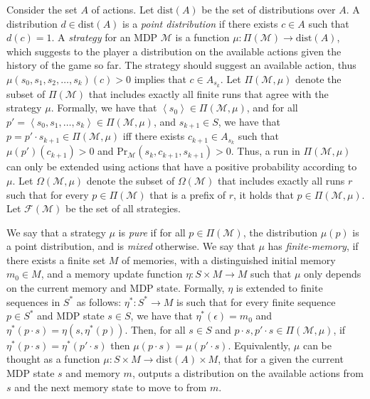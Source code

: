 \documentclass[10pt,a4paper]{amsart}
\theoremstyle{definition}
\numberwithin{equation}{section}
\newcommand{\M}{{\mathcal M}}
\newcommand{\F}{{\mathcal F}}
\newcommand{\zug}[1]{\left\langle #1 \right\rangle}
\renewcommand{\Pr}{\mathrm{Pr}}
\newcommand{\dist}{\mathrm{dist}}
\begin{document}
Consider the set $A$ of actions. Let $\dist(A)$ be the set of distributions over $A$. A distribution $d\in \dist(A)$ is a \emph{point distribution} if there exists $c\in A$ such that $d(c)=1$. A \emph{strategy} for an MDP $\M$ is a function $\mu : \Pi(\M)\rightarrow \dist(A)$, which suggests to the player a distribution on the available actions given the history of the game so far. The strategy should suggest an available action, thus $\mu(s_0,s_1,s_2,\ldots,s_k)(c)>0$ implies that $c\in A_{s_k}$. Let $\Pi(\M,\mu)$ denote the subset of $\Pi(\M)$ that includes exactly all finite runs that agree with the strategy $\mu$. Formally, we have that $\zug{s_0}\in \Pi(\M,\mu)$, and for all $p'=\zug{s_0,s_1,\ldots,s_k}\in \Pi(\M,\mu)$, and $s_{k+1}\in S$, we have that $p=p'\cdot s_{k+1}\in\Pi(\M,\mu)$ iff there exists $c_{k+1}\in A_{s_k}$ such that $\mu(p')(c_{k+1})>0$ and $\Pr_{\M}(s_{k},c_{k+1},s_{k+1})>0$. Thus, a run in $\Pi(\M,\mu)$ can only be extended using actions that have a positive probability according to $\mu$.
Let $\Omega(\M,\mu)$ denote the subset of $\Omega(\M)$ that includes exactly all runs $r$ such that for every $p\in \Pi(\M)$ that is a prefix of $r$, it holds that $p\in \Pi(\M,\mu)$. Let $\F(\M)$ be the set of all strategies.

We say that a strategy $\mu$ is \emph{pure} if for all $p \in \Pi(\M)$, the distribution $\mu(p)$ is a point distribution, and is \emph{mixed} otherwise.
We say that $\mu$ has \emph{finite-memory}, if there exists a finite set $M$ of memories, with a distinguished initial memory $m_0\in M$, and a memory update function $\eta:S\times M\to M$ such that $\mu$ only depends on the current memory and MDP state. Formally, $\eta$ is extended to finite sequences in $S^*$ as follows: $\eta^*: S^* \to M$ is such that for every finite sequence $p\in S^*$ and MDP state $s\in S$, we have that $\eta^*(\epsilon) = m_0$ and $\eta^*(p\cdot s) = \eta(s,\eta^*(p))$. 
Then, for all $s\in S$ and $p\cdot s,p'\cdot s\in \Pi(\M,\mu)$, if $\eta^*(p\cdot s)=\eta^*(p'\cdot s)$ then $\mu(p\cdot s)=\mu(p'\cdot s)$. Equivalently, $\mu$ can be thought as a function $\mu:S\times M\rightarrow \dist(A)\times M$, that for a given the current MDP state $s$ and memory $m$, outputs a distribution on the available actions from $s$ and the next memory state to move to from $m$. 
\end{document}
